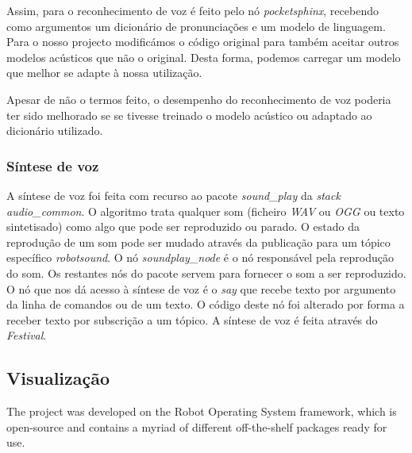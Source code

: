 \documentclass[journal]{IEEEtran}
\begin{document}
Assim, para o reconhecimento de voz é feito pelo nó \textit{pocketsphinx}, recebendo como argumentos um dicionário de pronunciações e um modelo de linguagem. Para o nosso projecto modificámos o código original para também aceitar outros modelos acústicos que não o original. Desta forma, podemos carregar um modelo que melhor se adapte à nossa utilização.

Apesar de não o termos feito, o desempenho do reconhecimento de voz poderia ter sido melhorado se se tivesse treinado o modelo acústico ou adaptado ao dicionário utilizado.


\subsubsection{Síntese de voz}

A síntese de voz foi feita com recurso ao pacote \textit{sound\_play} da \textit{stack} \textit{audio\_common}. O algoritmo trata qualquer som (ficheiro \emph{WAV} ou \emph{OGG} ou texto sintetisado) como algo que pode ser reproduzido ou parado. O estado da reprodução de um som pode ser mudado através da publicação para um tópico específico \textit{robotsound}. O nó \textit{soundplay\_node} é o nó responsável pela reprodução do som. Os restantes nós do pacote servem para fornecer o som a ser reproduzido. O nó que nos dá acesso à síntese de voz é o \textit{say} que recebe texto por argumento da linha de comandos ou de um texto. O código deste nó foi alterado por forma a receber texto por subscrição a um tópico. A síntese de voz é feita através do \emph{Festival}.


\subsection{Visualização}


The project was developed on the Robot Operating System framework, which is open-source and contains a myriad of different off-the-shelf packages ready for use.
\end{document}
